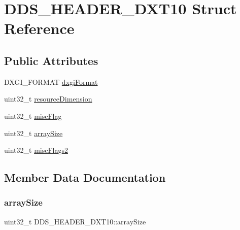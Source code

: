 \hypertarget{struct_d_d_s___h_e_a_d_e_r___d_x_t10}{}\section{D\+D\+S\+\_\+\+H\+E\+A\+D\+E\+R\+\_\+\+D\+X\+T10 Struct Reference}
\label{struct_d_d_s___h_e_a_d_e_r___d_x_t10}
\subsection*{Public Attributes}
\begin{DoxyCompactItemize}
\item 
D\+X\+G\+I\+\_\+\+F\+O\+R\+M\+AT \mbox{\hyperlink{struct_d_d_s___h_e_a_d_e_r___d_x_t10_a7208befc03e44222386ee54ee4fa9ec6}{dxgi\+Format}}
\item 
uint32\+\_\+t \mbox{\hyperlink{struct_d_d_s___h_e_a_d_e_r___d_x_t10_a9e52c1afbd5b8205619d1b89a367b438}{resource\+Dimension}}
\item 
uint32\+\_\+t \mbox{\hyperlink{struct_d_d_s___h_e_a_d_e_r___d_x_t10_ab1ed2a42216afc03971b56f7833c8c05}{misc\+Flag}}
\item 
uint32\+\_\+t \mbox{\hyperlink{struct_d_d_s___h_e_a_d_e_r___d_x_t10_ac4da0d495a89e556d02ac256af28da41}{array\+Size}}
\item 
uint32\+\_\+t \mbox{\hyperlink{struct_d_d_s___h_e_a_d_e_r___d_x_t10_acfdbfd584a5c6de801da3c8d2f0e1a40}{misc\+Flags2}}
\end{DoxyCompactItemize}


\subsection{Member Data Documentation}
\mbox{\label{struct_d_d_s___h_e_a_d_e_r___d_x_t10_ac4da0d495a89e556d02ac256af28da41}} 
\subsubsection{\texorpdfstring{array\+Size}{arraySize}}
{\footnotesize\ttfamily uint32\+\_\+t D\+D\+S\+\_\+\+H\+E\+A\+D\+E\+R\+\_\+\+D\+X\+T10\+::array\+Size}


